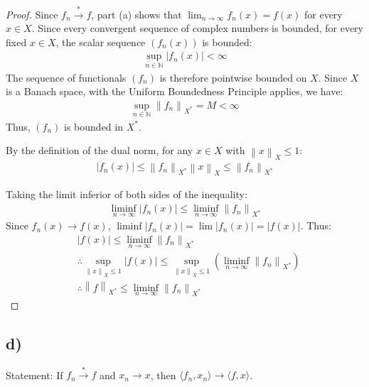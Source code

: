 \documentclass{article}
\newcommand{\norm}[1]{\left\|#1\right\|}
\begin{document}
\begin{proof}
    
    Since $f_{n} \xrightarrow{*} f$, part (a) shows that $\lim_{n \to \infty} f_n(x) = f(x)$ for every $x \in X$.
    Since every convergent sequence of complex numbers is bounded, for every fixed $x \in X$, the scalar sequence $(f_n(x))$ is bounded:
    \begin{align}
        \sup_{n \in \mathbb{N}} |f_n(x)| < \infty
    \end{align}
    The sequence of functionals $(f_n)$ is therefore pointwise bounded on $X$. Since $X$ is a Banach space, with the Uniform Boundedness Principle applies, we have:
    \begin{align}
        \sup_{n \in \mathbb{N}} \norm{f_n}_{X^{*}} = M < \infty
    \end{align}
    Thus, $(f_n)$ is bounded in $X^*$.

    By the definition of the dual norm, for any $x \in X$ with $\norm{x}_X \le 1$:
    \begin{align}
        |f_n(x)| 
        \le \norm{f_n}_{X^{*}} \norm{x}_X 
        \le \norm{f_n}_{X^{*}}
    \end{align}

    Taking the limit inferior of both sides of the inequality:
    \begin{align}
        \liminf_{n \to \infty} |f_n(x)| \le \liminf_{n \to \infty} \norm{f_n}_{X^{*}}
    \end{align}
    Since $f_n(x) \to f(x)$, $\liminf |f_n(x)| = \lim |f_n(x)| = |f(x)|$. Thus:
    \begin{align}
        &|f(x)| \le \liminf_{n \to \infty} \norm{f_n}_{X^{*}}
        \\
        &\therefore \sup_{\norm{x}_X \le 1} |f(x)| \le \sup_{\norm{x}_X \le 1} \left( \liminf_{n \to \infty} \norm{f_n}_{X^{*}} \right)
        \\
        &\therefore \norm{f}_{X^{*}} \le \liminf_{n \to \infty} \norm{f_n}_{X^{*}}
    \end{align}
\end{proof}

\subsection*{d)}

Statement: If $f_{n} \xrightarrow{*} f$ and $x_{n} \to x$, then $\langle f_{n}, x_{n} \rangle \rightarrow \langle f, x \rangle$.
\end{document}
